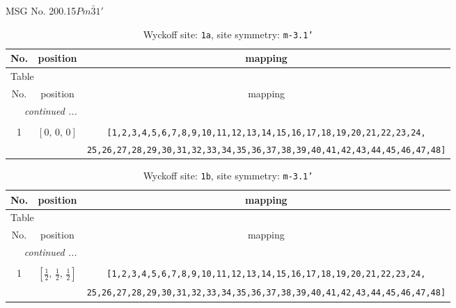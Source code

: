 \documentclass[fleqn,8pt]{jsarticle}
\begin{document}
\setcounter{MaxMatrixCols}{32}

\renewcommand{\tablename}{Table~}
\renewcommand{\figurename}{Figure~}
\begin{center}
\LARGE
MSG No. 200.15\quad$Pm\bar{3}1'$
\end{center}
\renewcommand{\arraystretch}{1.2}
\begin{longtable}{ccc}
\caption{Wyckoff site: {\tt 1a}, site symmetry: {\tt m-3.1'}}
 \\
 \hline \hline
No. & position & mapping \\ \hline \endfirsthead

\multicolumn{2}{l}{\tablename\ \thetable{}} \\
 \hline \hline
No. & position & mapping \\ \hline \endhead

 \hline \hline
\multicolumn{2}{r}{\footnotesize\it continued ...} \\ \endfoot

 \hline \hline
\multicolumn{2}{r}{} \\ \endlastfoot

1 & $\left[ 0,\, 0,\, 0 \right]$ & {\tt [1,2,3,4,5,6,7,8,9,10,11,12,13,14,15,16,17,18,19,20,21,22,23,24,} \\ \hline
 &  & {\tt 25,26,27,28,29,30,31,32,33,34,35,36,37,38,39,40,41,42,43,44,45,46,47,48]} \\
\end{longtable}
\renewcommand{\arraystretch}{1.2}
\begin{longtable}{ccc}
\caption{Wyckoff site: {\tt 1b}, site symmetry: {\tt m-3.1'}}
 \\
 \hline \hline
No. & position & mapping \\ \hline \endfirsthead

\multicolumn{2}{l}{\tablename\ \thetable{}} \\
 \hline \hline
No. & position & mapping \\ \hline \endhead

 \hline \hline
\multicolumn{2}{r}{\footnotesize\it continued ...} \\ \endfoot

 \hline \hline
\multicolumn{2}{r}{} \\ \endlastfoot

1 & $\left[ \frac{1}{2},\, \frac{1}{2},\, \frac{1}{2} \right]$ & {\tt [1,2,3,4,5,6,7,8,9,10,11,12,13,14,15,16,17,18,19,20,21,22,23,24,} \\ \hline
 &  & {\tt 25,26,27,28,29,30,31,32,33,34,35,36,37,38,39,40,41,42,43,44,45,46,47,48]} \\
\end{longtable}
\end{document}
